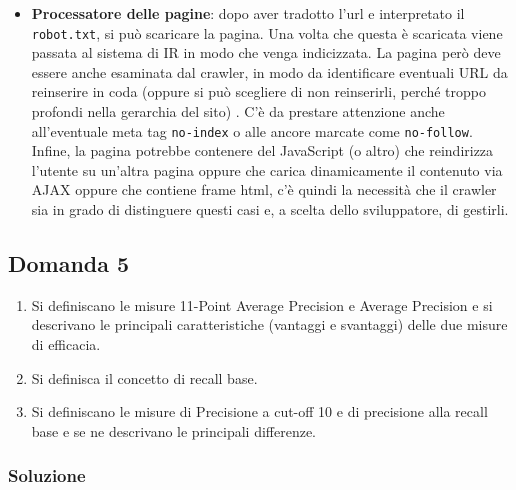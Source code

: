 \begin{itemize}
	\item \textbf{Processatore delle pagine}: dopo aver tradotto l'url e interpretato il \texttt{robot.txt}, si può scaricare la pagina. Una volta che questa è scaricata viene passata al sistema di IR in modo che venga indicizzata. La pagina però deve essere anche esaminata dal crawler, in modo da identificare eventuali URL da reinserire in coda (oppure si può scegliere di non reinserirli, perché troppo profondi nella gerarchia del sito) . C'è da prestare attenzione anche all'eventuale meta tag \texttt{no-index} o alle ancore marcate come \texttt{no-follow}. Infine, la pagina potrebbe contenere del JavaScript (o altro) che reindirizza l'utente su un'altra pagina oppure che carica dinamicamente il contenuto via AJAX oppure che contiene frame html, c'è quindi la necessità che il crawler sia in grado di distinguere questi casi e, a scelta dello sviluppatore, di gestirli.
\end{itemize}

\subsection{Domanda 5}

\begin{enumerate}
	\item Si definiscano le misure 11-Point Average Precision e Average Precision e si descrivano le principali caratteristiche (vantaggi e svantaggi) delle due misure di efficacia.
	\item Si definisca il concetto di recall base.
	\item Si definiscano le misure di Precisione a cut-off 10 e di precisione alla recall base e se ne descrivano le principali differenze.
\end{enumerate}

\subsubsection{Soluzione}

